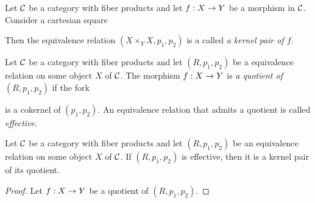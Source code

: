 \begin{definition}
Let ${\mathcal C}$ be a category with fiber products and let $f:X\rightarrow Y$ be a morphism in ${\mathcal C}$. Consider a cartesian square
\begin{center}
\end{center}
Then the equivalence relation $\left(X\times_YX,p_1,p_2\right)$ is a called \textit{a kernel pair of $f$}.
\end{definition}

\begin{definition}
Let ${\mathcal C}$ be a category with fiber products and let $(R,p_1,p_2)$ be a equivalence relation on some object $X$ of ${\mathcal C}$. The morphism $f:X\rightarrow Y$ is \textit{a quotient of $(R,p_1,p_2)$} if the fork
\begin{center}
\end{center}
is a cokernel of $(p_1,p_2)$. An equivalence relation that admits a quotient is called \textit{effective}.
\end{definition}

\begin{proposition}
Let ${\mathcal C}$ be a category with fiber products and let $(R,p_1,p_2)$ be an equivalence relation on some object $X$ of ${\mathcal C}$. If $(R,p_1,p_2)$ is effective, then it is a kernel pair of its quotient.
\end{proposition}
\begin{proof}
Let $f:X\rightarrow Y$ be a quotient of $(R,p_1,p_2)$.
\end{proof}

